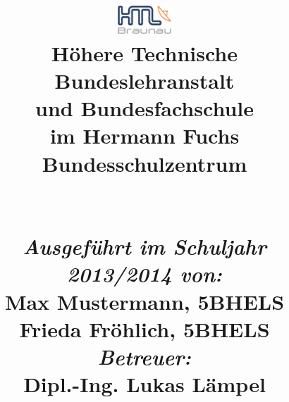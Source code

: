 
\begin{titlepage}
\title{
%
{\includegraphics[width=0.15\textwidth]{./includes/htl_c_cmyk_rein.pdf}}
%
\\{\normalsize \textbf{Höhere Technische Bundeslehranstalt}}
\\[-0.4em] {\normalsize \textbf{und Bundesfachschule}}
\\[-0.4em] {\normalsize im Hermann Fuchs Bundesschulzentrum}
%
\\\vspace{3cm}{ \textbf{\htlArbeitsthema}}
%
\\\vspace{0.5cm} {\Large \textsc{\htlArbeit}}
%
\\\vspace{5cm}
%
{\normalsize \emph{Ausgeführt im Schuljahr 2013/2014 von:}}
\\{\normalsize Max Mustermann, 5BHELS}
\\[-0.4em] {\normalsize Frieda Fröhlich, 5BHELS}
\\[1.0em] {\normalsize \emph{Betreuer:}}
\\{\normalsize Dipl.-Ing. Lukas Lämpel}
}		
%
\maketitle
\end{titlepage}
\restoregeometry
\pagebreak
